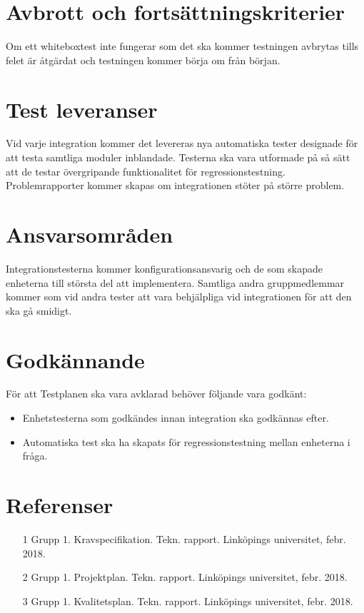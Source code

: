 \documentclass[10pt]{article}
\begin{document}
\section{Avbrott och fortsättningskriterier}
	Om ett whiteboxtest inte fungerar som det ska kommer testningen avbrytas tills felet är åtgärdat och testningen kommer börja om från början. 
	


\section{Test leveranser}
	Vid varje integration kommer det levereras nya automatiska tester designade för att testa samtliga moduler inblandade. Testerna ska vara utformade på så sätt att de testar övergripande funktionalitet för regressionstestning. Problemrapporter kommer skapas om integrationen stöter på större problem.

	

	

\section{Ansvarsområden}
	Integrationstesterna kommer konfigurationsansvarig och de som skapade enheterna till största del att implementera. Samtliga andra gruppmedlemmar kommer som vid andra tester att vara behjälpliga vid integrationen för att den ska gå smidigt. 


	
	
	
\section{Godkännande}
	För att Testplanen ska vara avklarad behöver följande vara godkänt:
	\begin{itemize}
	 \item Enhetstesterna som godkändes innan integration ska godkännas efter.
	\item Automatiska test ska ha skapats för regressionstestning mellan enheterna i fråga. 
	\end{itemize}
	


\section{Referenser}
	\begin{itemize}
	\item [1] Grupp 1. Kravspecifikation. Tekn. rapport. Linköpings universitet, febr. 2018.
	\item [2] Grupp 1. Projektplan. Tekn. rapport. Linköpings universitet, febr. 2018.
	\item [3] Grupp 1. Kvalitetsplan. Tekn. rapport. Linköpings universitet, febr. 2018.
	\end{itemize}
\end{document}

